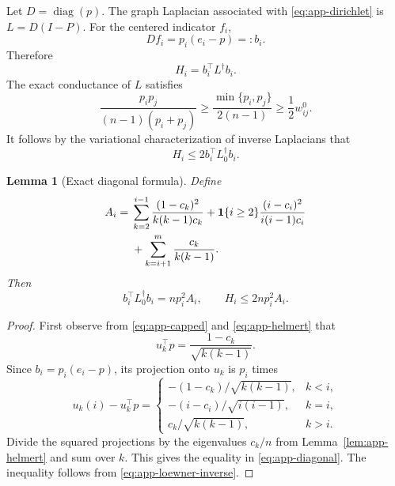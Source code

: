 \documentclass{article}
\newtheorem{lemma}[theorem]{Lemma}
\newcommand{\one}{\mathbf 1}
\begin{document}
Let $D=\operatorname{diag}(p)$. The graph Laplacian associated with
\eqref{eq:app-dirichlet} is $L=D(I-P)$. For the centered indicator $f_i$,
\begin{equation}
 Df_i=p_i(e_i-p)=:b_i.
 \label{eq:app-source}
\end{equation}
Therefore
\begin{equation}
 H_i=b_i^\top L^\dagger b_i.
 \label{eq:app-electrical}
\end{equation}
The exact conductance of $L$ satisfies
\begin{equation}
 \frac{p_ip_j}{(n-1)(p_i+p_j)}
 \ge\frac{\min\{p_i,p_j\}}{2(n-1)}
 \ge\frac12 w^0_{ij}.
 \label{eq:app-loewner}
\end{equation}
It follows by the variational characterization of inverse Laplacians that
\begin{equation}
 H_i\le2b_i^\top L_0^\dagger b_i.
 \label{eq:app-loewner-inverse}
\end{equation}

\begin{lemma}[Exact diagonal formula]
\label{lem:app-diagonal}
Define
\begin{align}
 A_i={}&\sum_{k=2}^{i-1}\frac{(1-c_k)^2}{k(k-1)c_k}
 +\one\{i\ge2\}\frac{(i-c_i)^2}{i(i-1)c_i}\notag\\
 &+\sum_{k=i+1}^{m}\frac{c_k}{k(k-1)}.
 \label{eq:app-Ai}
\end{align}
Then
\begin{equation}
 b_i^\top L_0^\dagger b_i=np_i^2A_i,
 \qquad H_i\le2np_i^2A_i.
 \label{eq:app-diagonal}
\end{equation}
\end{lemma}

\begin{proof}
First observe from \eqref{eq:app-capped} and \eqref{eq:app-helmert} that
\begin{equation}
 u_k^\top p=\frac{1-c_k}{\sqrt{k(k-1)}}.
 \label{eq:app-projected-mean}
\end{equation}
Since $b_i=p_i(e_i-p)$, its projection onto $u_k$ is $p_i$ times
\begin{equation}
 u_k(i)-u_k^\top p=
 \begin{cases}
 -(1-c_k)/\sqrt{k(k-1)}, & k<i,\\
 -(i-c_i)/\sqrt{i(i-1)}, & k=i,\\
 c_k/\sqrt{k(k-1)}, & k>i.
 \end{cases}
 \label{eq:app-projections}
\end{equation}
Divide the squared projections by the eigenvalues $c_k/n$ from
Lemma~\ref{lem:app-helmert} and sum over $k$. This gives the equality in
\eqref{eq:app-diagonal}. The inequality follows from
\eqref{eq:app-loewner-inverse}.
\end{proof}
\end{document}
